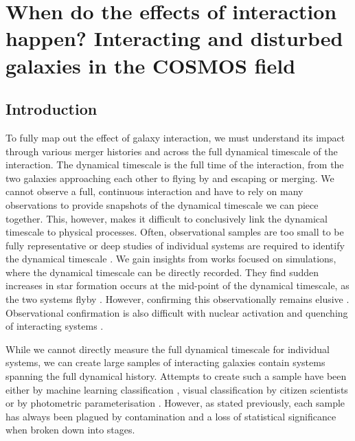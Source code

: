 \chapter{When do the effects of interaction happen? Interacting and disturbed galaxies in the COSMOS field}\label{chapter3}



\section{Introduction}\label{introduction}
\noindent To fully map out the effect of galaxy interaction, we must understand its impact through various merger histories and across the full dynamical timescale of the interaction. The dynamical timescale is the full time of the interaction, from the two galaxies approaching each other to flying by and escaping or merging. We cannot observe a full, continuous interaction and have to rely on many observations to provide snapshots of the dynamical timescale we can piece together. This, however, makes it difficult to conclusively link the dynamical timescale to physical processes. Often, observational samples are too small to be fully representative or deep studies of individual systems are required to identify the dynamical timescale \citep{2000ApJ...530..660B, 2012A&A...539A..45L, 2014A&A...567A.132W}. We gain insights from works focused on simulations, where the dynamical timescale can be directly recorded. They find sudden increases in star formation occurs at the mid-point of the dynamical timescale, as the two systems flyby \citep{2008MNRAS.384..386C, 2019MNRAS.490.2139R, 2021MNRAS.503.3113M}. However, confirming this observationally remains elusive \citep{2023ApJ...958...96R}. Observational confirmation is also difficult with nuclear activation and quenching of interacting systems \citep{2011MNRAS.418.2043E, 2018PASJ...70S..37G, 2023ApJ...942..107S}. 

While we cannot directly measure the full dynamical timescale for individual systems, we can create large samples of interacting galaxies contain systems spanning the full dynamical history. Attempts to create such a sample have been either by machine learning classification \citep{2019A&A...626A..49P, 2023A&A...669A.141S}, visual classification by citizen scientists \citep{2010MNRAS.401.1043D} or by photometric parameterisation \citep{2004AJ....128..163L, 2023MNRAS.522....1N}. However, as stated previously, each sample has always been plagued by contamination and a loss of statistical significance when broken down into stages.

